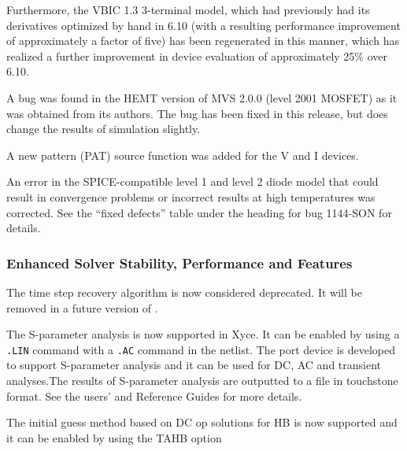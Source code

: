 \documentclass[letterpaper]{scrartcl}
\begin{document}
\begin{XyceItemize}
  Furthermore, the VBIC 1.3 3-terminal model, which had previously had
  its derivatives optimized by hand in \Xyce{} 6.10 (with a resulting
  performance improvement of approximately a factor of five) has been
  regenerated in this manner, which has realized a further improvement
  in device evaluation of approximately 25\% over \Xyce{} 6.10.
\item A bug was found in the HEMT version of MVS 2.0.0 (level 2001
  MOSFET) as it was obtained from its authors.  The bug has been fixed
  in this release, but does change the results of simulation slightly.
\item A new pattern (PAT) source function was added for the V
  and I devices.
\item An error in the SPICE-compatible level 1 and level 2 diode model
  that could result in convergence problems or incorrect results at
  high temperatures was corrected.  See the ``fixed defects'' table
  under the heading for bug 1144-SON for details.
\end{XyceItemize}

\subsubsection*{Enhanced Solver Stability, Performance and Features}
\begin{XyceItemize}
\item The time step recovery algorithm is now considered deprecated.  It will be removed in a future version of \Xyce{}.

\item The S-parameter analysis is now supported in Xyce. It can be enabled by using a \verb|.LIN| command with a \verb|.AC| command in the netlist. The port device is developed to support S-parameter analysis and it can be used for DC, AC and transient analyses.The results of S-parameter analysis are outputted to a file in touchstone format. See the \Xyce{} users' and Reference Guides
for more details.

\item The initial guess method based on DC op solutions for HB is now supported and it can be enabled by using the TAHB option

\end{XyceItemize}
\end{document}
